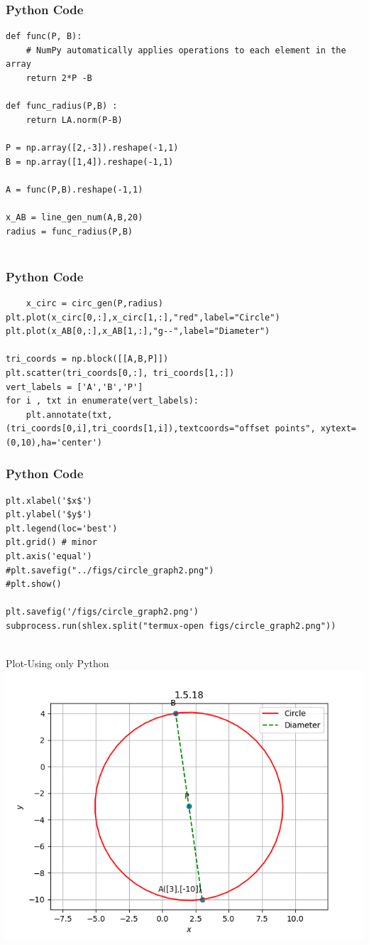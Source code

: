 \documentclass{beamer}
\begin{document}
\begin{frame}[fragile]
    \frametitle{Python Code}
    \begin{lstlisting}
def func(P, B):
    # NumPy automatically applies operations to each element in the array
    return 2*P -B

def func_radius(P,B) :
    return LA.norm(P-B)

P = np.array([2,-3]).reshape(-1,1)
B = np.array([1,4]).reshape(-1,1)

A = func(P,B).reshape(-1,1)

x_AB = line_gen_num(A,B,20)
radius = func_radius(P,B)


\end{lstlisting}
\end{frame}

\begin{frame}[fragile]
    \frametitle{Python Code}
    \begin{lstlisting}
    x_circ = circ_gen(P,radius)
plt.plot(x_circ[0,:],x_circ[1,:],"red",label="Circle")
plt.plot(x_AB[0,:],x_AB[1,:],"g--",label="Diameter")

tri_coords = np.block([[A,B,P]])
plt.scatter(tri_coords[0,:], tri_coords[1,:])
vert_labels = ['A','B','P']
for i , txt in enumerate(vert_labels):
    plt.annotate(txt,(tri_coords[0,i],tri_coords[1,i]),textcoords="offset points", xytext=(0,10),ha='center')
\end{lstlisting}
\end{frame}

\begin{frame}[fragile]
    \frametitle{Python Code }
    \begin{lstlisting}
plt.xlabel('$x$')
plt.ylabel('$y$')
plt.legend(loc='best')
plt.grid() # minor
plt.axis('equal')
#plt.savefig("../figs/circle_graph2.png")
#plt.show()

plt.savefig('/figs/circle_graph2.png')
subprocess.run(shlex.split("termux-open figs/circle_graph2.png"))


    \end{lstlisting}
\end{frame}


\begin{frame}{Plot-Using only Python}
    \centering
    \includegraphics[width=\columnwidth, height=0.8\textheight, keepaspectratio]{figs/circle_graph2.png}     
\end{frame}
\end{document}
